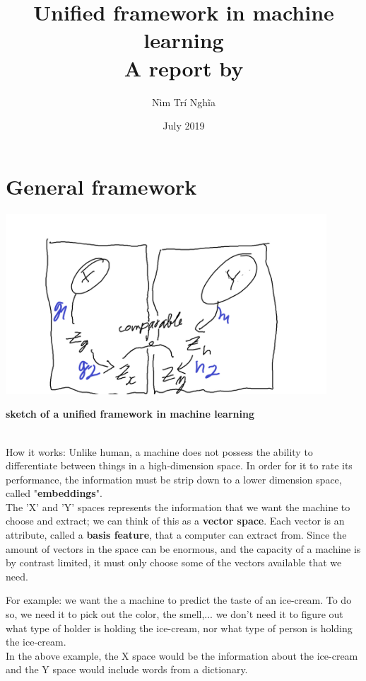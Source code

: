 \documentclass{article}
\title{Unified framework in machine learning\\A report by}
\author{Nìm Trí Nghĩa}
\date{July 2019}
\begin{document}
\maketitle

\section{General framework}
\includegraphics[width=12cm]{Untitled.png}\\

\centerline{\textbf{\small{sketch of a unified framework in machine learning}}}\\

How it works: Unlike human, a machine does not possess the ability to differentiate between things in a high-dimension space. In order for it to rate its performance, the information must be strip down to a lower dimension space, called "\textbf{embeddings}".\\

\hspace{1cm}The 'X' and 'Y' spaces represents the information that we want the machine to choose and extract; we can think of this as a \textbf{vector space}. Each vector is an attribute, called a \textbf{basis feature}, that a computer can extract from. Since the amount of vectors in the space can be enormous, and the capacity of a machine is by contrast limited, it must only choose some of the vectors available that we need.

\hspace{1cm}For example: we want the a machine to predict the taste of an ice-cream. To do so, we need it to pick out the color, the smell,... we don't need it to figure out what type of holder is holding the ice-cream, nor what type of person is holding the ice-cream.\\

In the above example, the X space would be the information about the ice-cream and the Y space would include words from a dictionary. 
\end{document}
